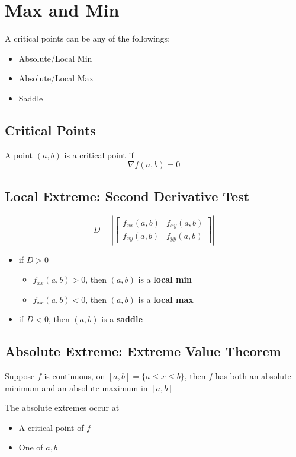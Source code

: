 \section{Max and Min}

  A critical points can be any of the followings:
  \begin{itemize}
    \item Absolute/Local Min
    \item Absolute/Local Max
    \item Saddle
  \end{itemize}

  \subsection{Critical Points}

    A point $ \left( a, b \right) $ is a critical point if
    \begin{equation}
      \nabla f \left( a, b \right) = 0
    \end{equation}

  \subsection{Local Extreme: Second Derivative Test}

    \begin{equation}
      D =
      \left|
        \begin{bmatrix}
          f_{xx} (a, b) & f_{xy} (a, b) \\
          f_{xy} (a, b) & f_{yy} (a, b)
        \end{bmatrix}
      \right|
    \end{equation}

    \begin{itemize}
      \item if $ D > 0 $
      \begin{itemize}
        \item $ f_{xx} (a, b) > 0 $, then $ (a, b) $ is a \textbf{local min}
        \item $ f_{xx} (a, b) < 0 $, then $ (a, b) $ is a \textbf{local max}
      \end{itemize}

      \item if $ D < 0 $, then $ (a, b) $ is a \textbf{saddle}
    \end{itemize}

  \subsection{Absolute Extreme: Extreme Value Theorem}

    Suppose $ f $ is continuous, on $ \left[ a, b \right] = \{ a \le x \le b \} $,
    then $ f $ has both an absolute minimum and an absolute maximum in
    $ \left[ a, b \right] $

    The absolute extremes occur at
    \begin{itemize}
      \item A critical point of $ f $
      \item One of $ a, b $
    \end{itemize}